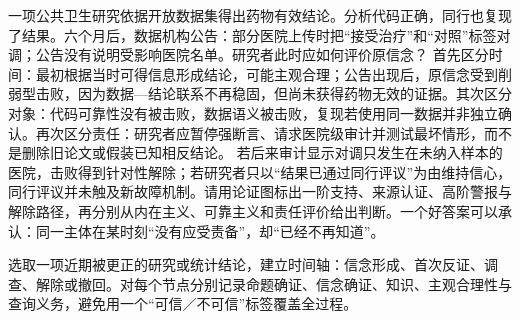 一项公共卫生研究依据开放数据集得出药物有效结论。分析代码正确，同行也复现了结果。六个月后，数据机构公告：部分医院上传时把“接受治疗”和“对照”标签对调；公告没有说明受影响医院名单。研究者此时应如何评价原信念？ 首先区分时间：最初根据当时可得信息形成结论，可能主观合理；公告出现后，原信念受到削弱型击败，因为数据—结论联系不再稳固，但尚未获得药物无效的证据。其次区分对象：代码可靠性没有被击败，数据语义被击败，复现若使用同一数据并非独立确认。再次区分责任：研究者应暂停强断言、请求医院级审计并测试最坏情形，而不是删除旧论文或假装已知相反结论。 若后来审计显示对调只发生在未纳入样本的医院，击败得到针对性解除；若研究者只以“结果已通过同行评议”为由维持信心，同行评议并未触及新故障机制。请用论证图标出一阶支持、来源认证、高阶警报与解除路径，再分别从内在主义、可靠主义和责任评价给出判断。一个好答案可以承认：同一主体在某时刻“没有应受责备”，却“已经不再知道”。

\begin{tcolorbox}[breakable,colback=white,colframe=blue!30!black,title={专题研读任务},fonttitle=\bfseries]
选取一项近期被更正的研究或统计结论，建立时间轴：信念形成、首次反证、调查、解除或撤回。对每个节点分别记录命题确证、信念确证、知识、主观合理性与查询义务，避免用一个“可信／不可信”标签覆盖全过程。
\end{tcolorbox}

